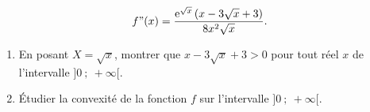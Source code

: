 \documentclass[10pt]{article}
\providecommand{\e}{{\mathrm{e}}}
\begin{document}
\begin{enumerate}
\[f"(x) = \dfrac{\e^{\sqrt{x}}\left(x - 3\sqrt x + 3\right)}{8x^2\sqrt x}.\]

	\begin{enumerate}
		\item En posant $X = \sqrt x$, montrer que $x - 3\sqrt x + 3 > 0$ pour tout réel $x$ de l'intervalle $]0~;~ + \infty[$.
		\item Étudier la convexité de la fonction $f$ sur l'intervalle $]0~;~ + \infty[$.
	\end{enumerate}
\end{enumerate}
\end{document}
